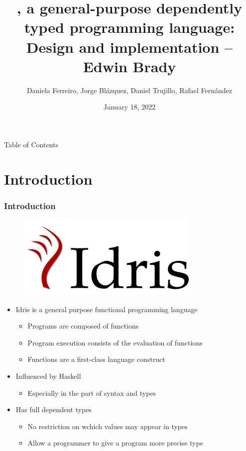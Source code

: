 \documentclass{beamer}
\title{\Idris, a general-purpose dependently typed programming language: Design and implementation -- Edwin Brady}
\author{Daniela Ferreiro, Jorge Blázquez, Daniel Trujillo, Rafael Fernández}
\date{January 18, 2022}
\begin{document}
\frame{\titlepage}

\begin{frame}{Table of Contents}
	\tableofcontents
\end{frame}
\newcommand{\intro}{Introduction}
\section{\intro}
\label{sec:intro}

\begin{frame}
	\frametitle{\intro}
	\begin{figure}
		\includegraphics[width=0.3\linewidth]{pics/idris.png}
		\label{fig:boat1}
	\end{figure}
	\begin{itemize}
		\setlength\itemsep{1em} 
		\item Idris is a general purpose functional programming language
		\begin{itemize}
			\item Programs are composed of functions
			\item Program execution consists of the evaluation of functions
			\item Functions are a first-class language construct
		\end{itemize}  
		\item Influenced by Haskell
		\begin{itemize}
			\item Especially in the part of syntax and types
		\end{itemize}   
		\item Has full dependent types
		\begin{itemize}
			\item No restriction on wchich values may appear in types
			\item Allow a programmer to give a program more precise type
		\end{itemize}   
	\end{itemize}
\end{frame}

\newcommand{\dependentTypes}{Dependent Types - Examples}
\end{document}

